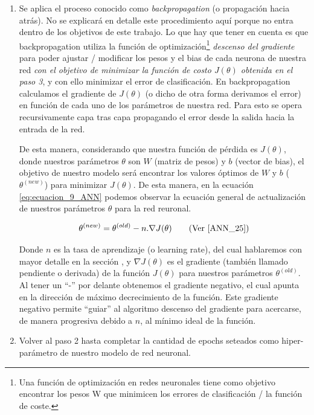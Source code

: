 \documentclass[12pt,a4paper]{article}
\begin{document}
\begin{sloppypar}
\begin{enumerate}
\item Se aplica el proceso conocido como \textit{backpropagation} (o propagación hacia atrás). No se explicará en detalle este procedimiento aquí porque no entra dentro de los objetivos de este trabajo. Lo que hay que tener en cuenta es que backpropagation utiliza la función de optimización\footnote{Una función de optimización en redes neuronales tiene como objetivo encontrar los pesos W que minimicen los errores de clasificación / la función de coste.} \textit{descenso del gradiente} para poder ajustar / modificar los pesos y el bias de cada neurona de nuestra red \textit{con el objetivo de minimizar la función de costo $J(\theta)$ obtenida en el paso 3}, y con ello minimizar el error de clasificación. En backpropagation calculamos el gradiente de $J(\theta)$ (o dicho de otra forma derivamos el error) en función de cada uno de los parámetros de nuestra red. Para esto se opera recursivamente capa tras capa propagando el error desde la salida hacia la entrada de la red.

De esta manera, considerando que nuestra función de pérdida es $J(\theta)$, donde nuestros parámetros $\theta$ son $W$ (matriz de pesos) y $b$ (vector de bias), el objetivo de nuestro modelo será encontrar los valores óptimos de $W$ y $b$ ($\theta^{(new)}$) para minimizar $J(\theta)$. De esta manera, en la ecuación \ref{eq:ecuacion_9_ANN} podemos observar la ecuación general de actualización de nuestros parámetros $\theta$ para la red reuronal.
 
\begin{equation}\label{eq:ecuacion_9_ANN}
\theta^{(new)} = \theta^{(old)} - n . \nabla J(\theta)   \qquad \text{(Ver \cite{ANN_25})}
\end{equation}

Donde $n$ es la tasa de aprendizaje (o learning rate), del cual hablaremos con mayor detalle en la sección \textit{}, y $\nabla J(\theta)$ es el gradiente (también llamado pendiente o derivada) de la función $J(\theta)$ para nuestros parámetros $\theta^{(old)}$. Al tener un “-” por delante obtenemos el gradiente negativo, el cual apunta en la dirección de máximo decrecimiento de la función. Este gradiente negativo permite “guiar” al algoritmo descenso del gradiente para acercarse, de manera progresiva debido a $n$, al mínimo ideal de la función.      

\item Volver al paso 2 hasta completar la cantidad de epochs seteados como hiper-parámetro de nuestro modelo de red neuronal. 


\end{enumerate}
\end{sloppypar}
\end{document}
